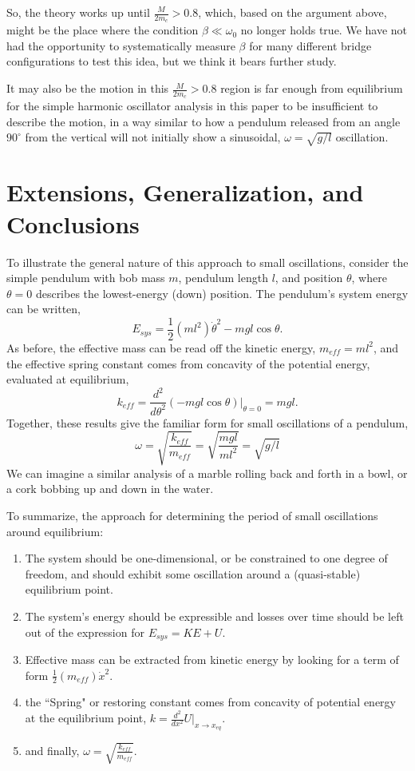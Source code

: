 \documentclass[12pt]{iopart}
\newcommand{\be}{\begin{equation}}
\newcommand{\ee}{\end{equation}}
\begin{document}
So, the theory works up until $\frac{M}{2m_c}>0.8$, which, based on the argument above, might be the place where the condition $\beta \ll \omega_0$ no longer holds true.   We have not had the opportunity to systematically measure $\beta$ for many different bridge configurations to test this idea, but we think it bears further study.  

It may also be the motion in this $\frac{M}{2m_c}>0.8$ region is far enough from equilibrium for the simple harmonic oscillator analysis in this paper to be insufficient to describe the motion, in a way similar to how a pendulum released from an angle $90^{\circ}$ from the vertical will not initially show a sinusoidal, $\omega=\sqrt{g/l}$ oscillation.
%
%

\section{Extensions, Generalization, and Conclusions}
To illustrate the general nature of this approach to small oscillations, consider the simple pendulum with bob mass $m$, pendulum length $l$, and position $\theta$, where $\theta=0$ describes the lowest-energy (down) position.  The pendulum's system energy can be written,
\be
E_{sys}=\frac{1}{2}\left(m l^2 \right) \dot{\theta}^2-mgl\cos \theta.
\ee 
As before, the effective mass can be read off the kinetic energy, 
$m_{eff}=ml^2$, 
and the effective spring constant comes from concavity of the potential energy, evaluated at equilibrium,
\be
k_{eff}=\frac{ d^2 }{ d \theta ^2 } (-m g l \cos \theta) |_{\theta=0}=mgl.
\ee
Together, these results give the familiar form for small oscillations of a pendulum, 
\be
\omega=\sqrt{\frac{k_{eff}}{m_{eff}}} = \sqrt{\frac{mgl}{m l^2}}=\sqrt{g/l}
\ee
We can imagine a similar analysis of a marble rolling back and forth in a bowl, or a cork bobbing up and down in the water. 

To summarize, the approach for determining the period of small oscillations around equilibrium:
\begin{enumerate}
\item The system should be one-dimensional, or be constrained to one degree of freedom, and should exhibit some oscillation around a (quasi-stable) equilibrium point.
\item The system's energy should be expressible and losses over time should be left out of the expression for 
$E_{sys}=KE+U$.
\item Effective mass can be extracted from kinetic energy by looking for a term of form 
$\frac{1}{2}\left(m_{eff}\right) \dot{x}^2$.
\item the ``Spring" or restoring constant comes from concavity of potential energy at the equilibrium point, 
$k=\frac{d^2}{dx^2}U|_{x\to x_{eq}}$.
\item and finally, $\omega=\sqrt{\frac{k_{eff}}{m_{eff}}}$.
\end{enumerate}
\end{document}
